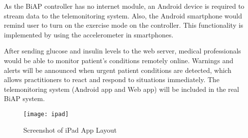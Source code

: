 \documentclass[conference,final,9pt,twocolumn,a4paper]{IEEEtran}
\begin{document}
As the BiAP controller has no internet module, an Android device is required to stream data to the telemonitoring system. Also, the Android smartphone would remind user to turn on the exercise mode on the controller. This functionality is implemented by using the accelerometer in smartphones.

After sending glucose and insulin levels to the web server, medical professionals would be able to monitor patient's conditions remotely online. Warnings and alerts will be announced when urgent patient conditions are detected, which allows practitioners to react and respond to situations immediately. The telemonitoring system (Android app and Web app) will be included in the real BiAP system.



\begin{figure}[h]
    \centerline{\texttt{[image: ipad]}}
    \caption{Screenshot of iPad App Layout}
    \label{fig:ipad}
\end{figure}



\end{document}
